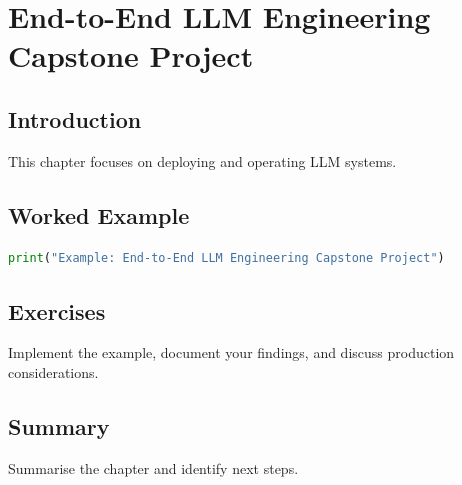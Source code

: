 \chapter{End-to-End LLM Engineering Capstone Project}
\label{chap:vol9-20}



\section{Introduction}
This chapter focuses on deploying and operating LLM systems.

\section{Worked Example}
\begin{lstlisting}[language=Python]
print("Example: End-to-End LLM Engineering Capstone Project")
\end{lstlisting}

\section{Exercises}
\begin{exercise}
Implement the example, document your findings, and discuss production considerations.
\end{exercise}

\section{Summary}
Summarise the chapter and identify next steps.
